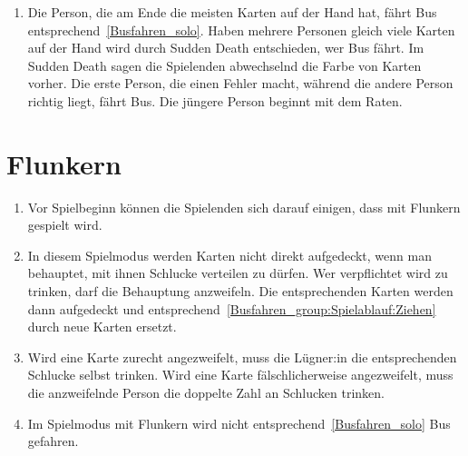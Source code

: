 \begin{enumerate}[label={(\arabic*)}]
    \item
    Die Person, die am Ende die meisten Karten auf der Hand hat, fährt Bus entsprechend~\ref{Busfahren_solo}.
    Haben mehrere Personen gleich viele Karten auf der Hand wird durch Sudden Death entschieden, wer Bus fährt.
    Im Sudden Death sagen die Spielenden abwechselnd die Farbe von Karten vorher.
    Die erste Person, die einen Fehler macht, während die andere Person richtig liegt, fährt Bus.
    Die jüngere Person beginnt mit dem Raten.
\end{enumerate}

\section{Flunkern}
\begin{enumerate}[label={(\arabic*)}]
\item
Vor Spielbeginn können die Spielenden sich darauf einigen, dass mit Flunkern gespielt wird.

\item
In diesem Spielmodus werden Karten nicht direkt aufgedeckt, wenn man behauptet, mit ihnen Schlucke verteilen zu dürfen.
Wer verpflichtet wird zu trinken, darf die Behauptung anzweifeln.
Die entsprechenden Karten werden dann aufgedeckt und entsprechend~\ref{Busfahren_group:Spielablauf:Ziehen} durch neue Karten ersetzt.

\item
Wird eine Karte zurecht angezweifelt, muss die Lügner:in die entsprechenden Schlucke selbst trinken.
Wird eine Karte fälschlicherweise angezweifelt, muss die anzweifelnde Person die doppelte Zahl an Schlucken trinken.

\item
Im Spielmodus mit Flunkern wird nicht entsprechend~\ref{Busfahren_solo} Bus gefahren.
\end{enumerate}

